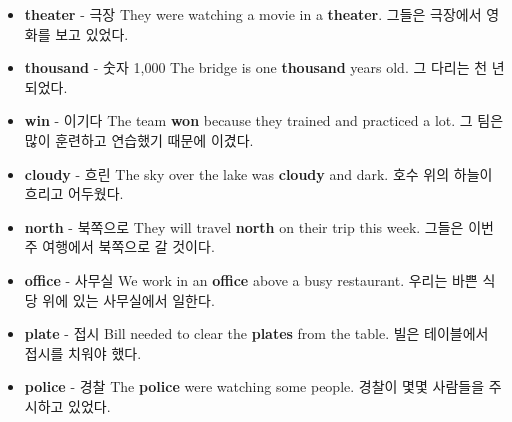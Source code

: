 \documentclass{article}
\begin{document}
\begin{addmargin}[1em]{1em}
\begin{itemize}
        \item \fontsize{12pt}{14pt}\selectfont \textbf{theater} - 극장 \newline
        They were watching a movie in a \textbf{theater}. \newline
        그들은 극장에서 영화를 보고 있었다.
        
        \item \fontsize{12pt}{14pt}\selectfont \textbf{thousand} - 숫자 1,000 \newline
        The bridge is one \textbf{thousand} years old. \newline
        그 다리는 천 년 되었다.
        
        \item \fontsize{12pt}{14pt}\selectfont \textbf{win} - 이기다 \newline
        The team \textbf{won} because they trained and practiced a lot. \newline
        그 팀은 많이 훈련하고 연습했기 때문에 이겼다.
        
        \item \fontsize{12pt}{14pt}\selectfont \textbf{cloudy} - 흐린 \newline
        The sky over the lake was \textbf{cloudy} and dark. \newline
        호수 위의 하늘이 흐리고 어두웠다.
        
        \item \fontsize{12pt}{14pt}\selectfont \textbf{north} - 북쪽으로 \newline
        They will travel \textbf{north} on their trip this week. \newline
        그들은 이번 주 여행에서 북쪽으로 갈 것이다.
        
        \item \fontsize{12pt}{14pt}\selectfont \textbf{office} - 사무실 \newline
        We work in an \textbf{office} above a busy restaurant. \newline
        우리는 바쁜 식당 위에 있는 사무실에서 일한다.
        
        \item \fontsize{12pt}{14pt}\selectfont \textbf{plate} - 접시 \newline
        Bill needed to clear the \textbf{plates} from the table. \newline
        빌은 테이블에서 접시를 치워야 했다.
        
        \item \fontsize{12pt}{14pt}\selectfont \textbf{police} - 경찰 \newline
        The \textbf{police} were watching some people. \newline
        경찰이 몇몇 사람들을 주시하고 있었다.
        

\end{itemize}
\end{addmargin}
\end{document}
